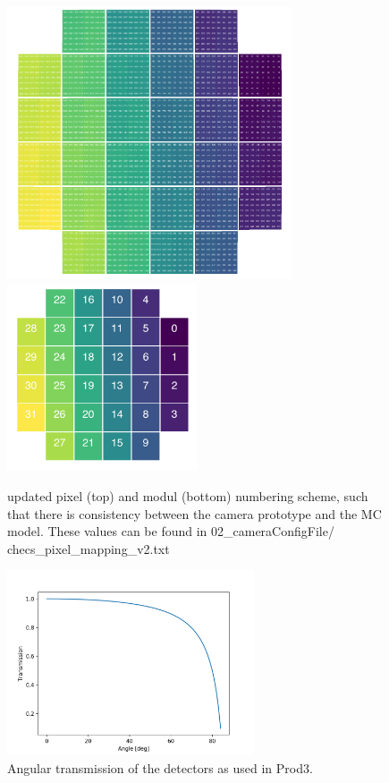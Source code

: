 \documentclass[GCT,short]{gct}
\begin{document}
\begin{figure}
\centering
\includegraphics[width=0.75\textwidth]{../02_cameraConfigFile/pixel_mapping.png} \\ \includegraphics[width=0.5\textwidth]{../02_cameraConfigFile/module_mapping.png}  
\caption{updated pixel (top) and modul (bottom) numbering scheme, such that there is consistency between the camera prototype and the MC model. These values can be found in 02\_cameraConfigFile/ checs\_pixel\_mapping\_v2.txt}
\label{fig:mapping}
\end{figure}



\begin{figure}
\centering
\includegraphics[width=0.65\textwidth]{../02_cameraConfigFile/angleTrans.png}
\caption{Angular transmission of the detectors as used in Prod3.}
\label{fig:trans}
\end{figure}
\end{document}
